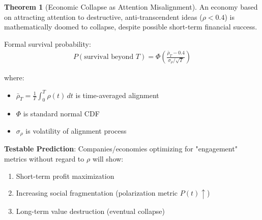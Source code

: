 \documentclass[11pt,a4paper]{article}
\theoremstyle{definition}
\newtheorem{theorem}{Theorem}[section]
\theoremstyle{remark}
\begin{document}
\begin{theorem}[Economic Collapse as Attention Misalignment]
An economy based on attracting attention to destructive, anti-transcendent ideas (\(\rho < 0.4\)) is mathematically doomed to collapse, despite possible short-term financial success.

Formal survival probability:
\begin{align}
P(\text{survival beyond } T) = \Phi\left(\frac{\bar{\rho}_T - 0.4}{\sigma_{\rho}/\sqrt{T}}\right)
\end{align}

where:
\begin{itemize}
    \item \(\bar{\rho}_T = \frac{1}{T} \int_0^T \rho(t) \, dt\) is time-averaged alignment
    \item \(\Phi\) is standard normal CDF
    \item \(\sigma_{\rho}\) is volatility of alignment process
\end{itemize}

\textbf{Testable Prediction}: Companies/economies optimizing for "engagement" metrics without regard to \(\rho\) will show:
\begin{enumerate}
\item Short-term profit maximization
\item Increasing social fragmentation (polarization metric \(P(t) \uparrow\))
\item Long-term value destruction (eventual collapse)
\end{enumerate}
\end{theorem}
\end{document}
